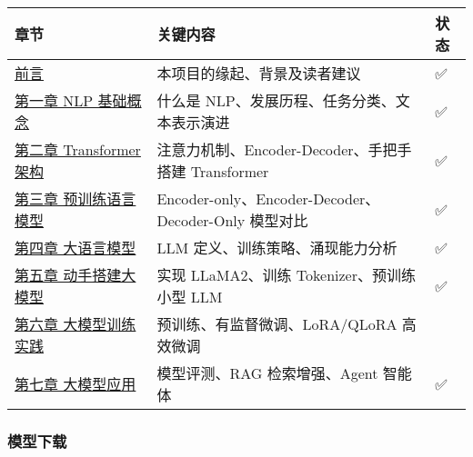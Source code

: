 \documentclass[12pt,a4paper]{book}
\begin{document}
\begin{longtable}[]{@{}
  >{\raggedright\arraybackslash}p{}
  >{\raggedright\arraybackslash}p{}
  >{\raggedright\arraybackslash}p{}@{}}
\toprule\noalign{}
\begin{minipage}[b]{\linewidth}\raggedright
章节
\end{minipage} & \begin{minipage}[b]{\linewidth}\raggedright
关键内容
\end{minipage} & \begin{minipage}[b]{\linewidth}\raggedright
状态
\end{minipage} \\
\midrule\noalign{}
\endhead
\bottomrule\noalign{}
\endlastfoot
\href{./前言.md}{前言} & 本项目的缘起、背景及读者建议 & ✅ \\
\href{./chapter1/第一章\%20NLP基础概念.md}{第一章 NLP 基础概念} & 什么是
NLP、发展历程、任务分类、文本表示演进 & ✅ \\
\href{./chapter2/第二章\%20Transformer架构.md}{第二章 Transformer 架构}
& 注意力机制、Encoder-Decoder、手把手搭建 Transformer & ✅ \\
\href{./chapter3/第三章\%20预训练语言模型.md}{第三章 预训练语言模型} &
Encoder-only、Encoder-Decoder、Decoder-Only 模型对比 & ✅ \\
\href{./chapter4/第四章\%20大语言模型.md}{第四章 大语言模型} & LLM
定义、训练策略、涌现能力分析 & ✅ \\
\href{./chapter5/第五章\%20动手搭建大模型.md}{第五章 动手搭建大模型} &
实现 LLaMA2、训练 Tokenizer、预训练小型 LLM & ✅ \\
\href{./chapter6/第六章\%20大模型训练流程实践.md}{第六章 大模型训练实践}
& 预训练、有监督微调、LoRA/QLoRA 高效微调 & 🚧 \\
\href{./chapter7/第七章\%20大模型应用.md}{第七章 大模型应用} &
模型评测、RAG 检索增强、Agent 智能体 & ✅ \\
\end{longtable}

\subsubsection{模型下载}\label{ux6a21ux578bux4e0bux8f7d}
\end{document}
